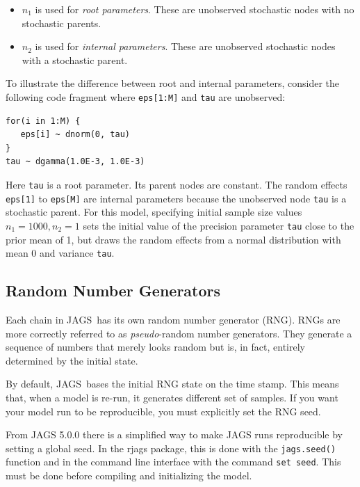 \documentclass[11pt, a4paper, titlepage]{report}
\newcommand{\JAGS}{\textsf{JAGS}}
\begin{document}
\begin{itemize}
\item $n_1$ is used for {\em root parameters}. These are
  unobserved stochastic nodes with no stochastic parents.
\item  $n_2$ is used for {\em internal parameters}. These
  are unobserved stochastic nodes with a stochastic parent.
\end{itemize}

To illustrate the difference between root and internal parameters,
consider the following code fragment where \texttt{eps[1:M]} and
\texttt{tau} are unobserved:

\begin{verbatim}
for(i in 1:M) {
   eps[i] ~ dnorm(0, tau)
}
tau ~ dgamma(1.0E-3, 1.0E-3)
\end{verbatim}

Here \texttt{tau} is a root parameter. Its parent nodes are constant.
The random effects \texttt{eps[1]} to \texttt{eps[M]} are internal
parameters because the unobserved node \texttt{tau} is a stochastic
parent. For this model, specifying initial sample size values $n_1 =
1000, n_2 = 1$ sets the initial value of the precision parameter
\texttt{tau} close to the prior mean of 1, but draws the random
effects from a normal distribution with mean 0 and variance
\texttt{tau}.

\subsection{Random Number Generators}
\label{section:rngs}

Each chain in \JAGS\ has its own random number generator (RNG). RNGs
are more correctly referred to as {\em pseudo}-random number
generators. They generate a sequence of numbers that merely looks
random but is, in fact, entirely determined by the initial state.

By default, \JAGS\ bases the initial RNG state on the time stamp. This
means that, when a model is re-run, it generates different set of
samples. If you want your model run to be reproducible, you must
explicitly set the RNG seed.

From JAGS 5.0.0 there is a simplified way to make JAGS runs
reproducible by setting a global seed. In the \textsf{rjags} package,
this is done with the \texttt{jags.seed()} function and in the command
line interface with the command \texttt{set seed}. This must be done
before compiling and initializing the model.
\end{document}
